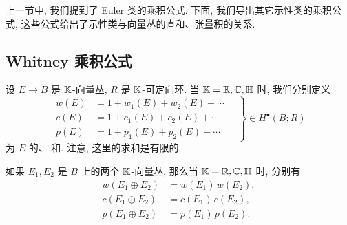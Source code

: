 上一节中, 我们提到了 Euler 类的乘积公式.
下面, 我们导出其它示性类的乘积公式, 
这些公式给出了示性类与向量丛的直和、张量积的关系.

\subsection{Whitney 乘积公式}

\begin{definition}
    设 $E \to B$ 是 $\mathbb{K}$-向量丛, $R$ 是 $\mathbb{K}$-可定向环. 
    当 $\mathbb{K} = \mathbb{R}, \mathbb{C}, \mathbb{H}$ 时, 我们分别定义
    \[ \left. \begin{aligned}
        w(E) & = 1 + w_1(E) + w_2(E) + \cdots \\
        c(E) & = 1 + c_1(E) + c_2(E) + \cdots \\
        p(E) & = 1 + p_1(E) + p_2(E) + \cdots
    \end{aligned} \quad \right\} \in H^\bullet (B; R) \]
    为 $E$ 的、
    和.
    注意, 这里的求和是有限的.
\end{definition}

\begin{theorem}
    如果 $E_1,E_2$ 是 $B$ 上的两个 $\mathbb{K}$-向量丛, 
    那么当 $\mathbb{K} = \mathbb{R}, \mathbb{C}, \mathbb{H}$ 时, 分别有
    \[ \begin{aligned}
        w (E_1 \oplus E_2) & = w (E_1) \, w (E_2), \\
        c (E_1 \oplus E_2) & = c (E_1) \, c (E_2), \\
        p (E_1 \oplus E_2) & = p (E_1) \, p (E_2).
    \end{aligned} \]
\end{theorem}

